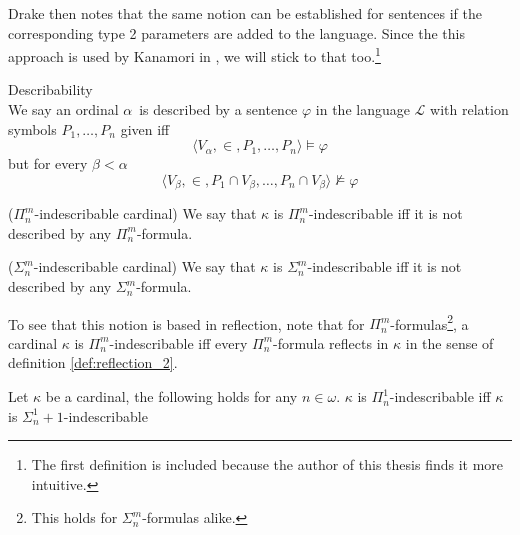 Drake then notes that the same notion can be established for sentences if the corresponding type 2 parameters are added to the language. Since the this approach is used by Kanamori in \cite{KanamoriBook}, we will stick to that too.\footnote{The first definition is included because the author of this thesis finds it more intuitive.}
\begin{definition}{Describability}\label{def:describability}\\
We say an ordinal $\alpha$ is described by a sentence $\varphi$ in the language $\mathscr{L}$ with relation symbols $P_1, \ldots, P_n$ given iff
\begin{equation}
\langle V_\alpha, \in, P_1, \ldots, P_n \rangle \models \varphi
\end{equation}
but for every $\beta < \alpha$
\begin{equation}
\langle V_\beta, \in, P_1 \cap V_\beta, \ldots, P_n \cap V_\beta \rangle \not\models \varphi
\end{equation}
\end{definition}



\begin{definition}{($\Pi^m_n$-indescribable cardinal)}\label{def:pi_mn_indescribable}
We say that $\kappa$ is $\Pi^m_n$-indescribable iff it is not described by any $\Pi^m_n$-formula.
\end{definition}
\begin{definition}{($\Sigma^m_n$-indescribable cardinal)}\label{def:sigma_mn_indescribable}
We say that $\kappa$ is $\Sigma^m_n$-indescribable iff it is not described by any $\Sigma^m_n$-formula.
\end{definition}

To see that this notion is based in reflection, note that for $\Pi^m_n$-formulas\footnote{This holds for $\Sigma^m_n$-formulas alike.}, a cardinal $\kappa$ is $\Pi^m_n$-indescribable iff every $\Pi^m_n$-formula reflects in $\kappa$ in the sense of definition \ref{def:reflection_2}.

\begin{lemma}
Let $\kappa$ be a cardinal, the following holds for any $n \in \omega$. $\kappa$ is $\Pi^1_n$-indescribable iff $\kappa$ is $\Sigma^1_n+1$-indescribable
\end{lemma}

